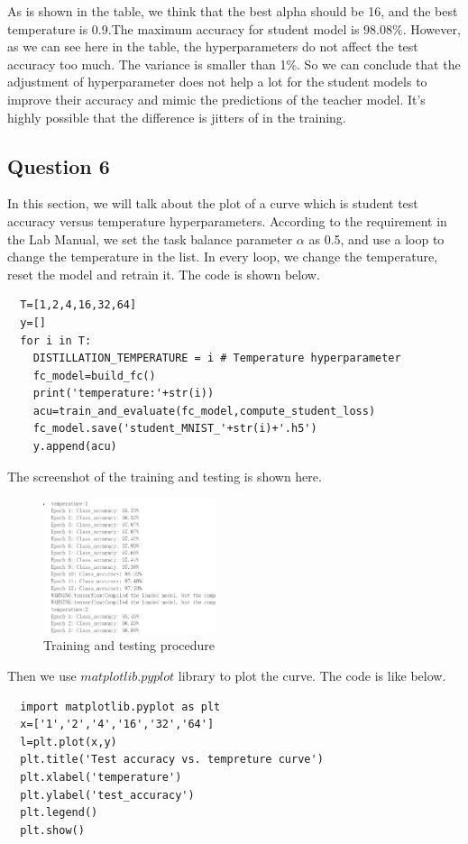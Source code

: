 \documentclass[conference]{IEEEtran}
\begin{document}
  As is shown in the table, we think that the best alpha should be 16, and the best temperature is 0.9.The maximum accuracy for student model is $98.08\%$. However, as we can see here in the table, the hyperparameters do not affect the test accuracy too much. The variance is smaller than 1\%. So we can conclude that the adjustment of hyperparameter does not help a lot for the student models to improve their accuracy and mimic the predictions of the teacher model. It's highly possible that the difference is jitters of in the training.
  \subsection{Question 6}
  In this section, we will talk about the plot of a curve which is student test accuracy versus temperature hyperparameters. 
  According to the requirement in the Lab Manual, we set the task balance parameter $\alpha$ as 0.5, and use a loop to change the temperature in the list.
  In every loop, we change the temperature, reset the model and retrain it. The code is shown below.
  \begin{lstlisting}
  T=[1,2,4,16,32,64]
  y=[]
  for i in T:
    DISTILLATION_TEMPERATURE = i # Temperature hyperparameter
    fc_model=build_fc()
    print('temperature:'+str(i))
    acu=train_and_evaluate(fc_model,compute_student_loss)
    fc_model.save('student_MNIST_'+str(i)+'.h5')
    y.append(acu)
  \end{lstlisting}
  The screenshot of the training and testing is shown here.
  \begin{figure}[h] 
      \centering
      \includegraphics[width=0.45\textwidth]{./graphs/T1Q6_train.png}
      \caption{Training and testing procedure}
      \label{Fig.t1q3e}
  \end{figure}
  Then we use $matplotlib.pyplot$ library to plot the curve.
  The code is like below.
  \begin{lstlisting}
  import matplotlib.pyplot as plt
  x=['1','2','4','16','32','64']
  l=plt.plot(x,y)
  plt.title('Test accuracy vs. tempreture curve')
  plt.xlabel('temperature')
  plt.ylabel('test_accuracy')
  plt.legend()
  plt.show()
  \end{lstlisting}
\end{document}
